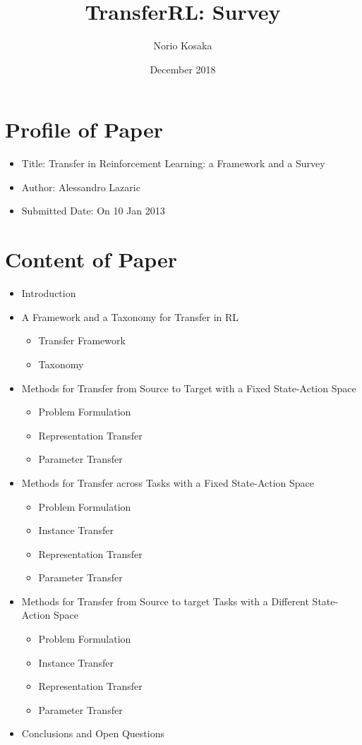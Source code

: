 \documentclass{article}
\title{TransferRL: Survey}
\author{Norio Kosaka}
\date{December 2018}
\begin{document}
\maketitle

\section{Profile of Paper}
\begin{itemize}
    \item Title: Transfer in Reinforcement Learning: a Framework and a Survey \cite{lazaric2012transfer}
    \item Author: Alessandro Lazaric
    \item Submitted Date: On 10 Jan 2013
\end{itemize}

\section{Content of Paper}
\begin{itemize}
    \item Introduction
    \item A Framework and a Taxonomy for Transfer in RL
    \begin{itemize}
        \item Transfer Framework
        \item Taxonomy
    \end{itemize}
    \item Methods for Transfer from Source to Target with a Fixed State-Action Space
    \begin{itemize}
        \item Problem Formulation
        \item Representation Transfer
        \item Parameter Transfer
    \end{itemize}
    \item Methods for Transfer across Tasks with a Fixed State-Action Space
    \begin{itemize}
        \item Problem Formulation
        \item Instance Transfer
        \item Representation Transfer
        \item Parameter Transfer
    \end{itemize}
    \item Methods for Transfer from Source to target Tasks with a Different State-Action Space
    \begin{itemize}
        \item Problem Formulation
        \item Instance Transfer
        \item Representation Transfer
        \item Parameter Transfer
    \end{itemize}
    \item Conclusions and Open Questions
\end{itemize}
\end{document}
